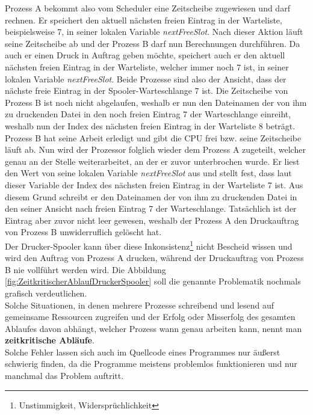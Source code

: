 \begin{description}
						Prozess A bekommt also vom Scheduler eine Zeitscheibe zugewiesen und darf rechnen. Er speichert den aktuell nächsten freien Eintrag in der Warteliste, beispielsweise 7, in seiner lokalen Variable \textit{nextFreeSlot}. Nach dieser Aktion läuft seine Zeitscheibe ab und der Prozess B darf nun Berechnungen durchführen. Da auch er einen Druck in Auftrag geben möchte, speichert auch er den aktuell nächsten freien Eintrag in der Warteliste, welcher immer noch 7 ist, in seiner lokalen Variable \textit{nextFreeSlot}. Beide Prozesse sind also der Ansicht, dass der nächste freie Eintrag in der Spooler-Warteschlange 7 ist. Die Zeitscheibe von Prozess B ist noch nicht abgelaufen, weshalb er nun den Dateinamen der von ihm zu druckenden Datei in den noch freien Eintrag 7 der Warteschlange einreiht, weshalb nun der Index des nächsten freien Eintrag in der Warteliste 8 beträgt. Prozess B hat seine Arbeit erledigt und gibt die CPU frei bzw. seine Zeitscheibe läuft ab. Nun wird der Prozessor folglich wieder dem Prozess A zugeteilt, welcher genau an der Stelle weiterarbeitet, an der er zuvor unterbrochen wurde. Er liest den Wert von seine lokalen Variable \textit{nextFreeSlot} aus und stellt fest, dass laut dieser Variable der Index des nächsten freien Eintrag in der Warteliste 7 ist. Aus diesem Grund schreibt er den Dateinamen der von ihm zu druckenden Datei in den seiner Ansicht nach freien Eintrag 7 der Warteschlange. Tatsächlich ist der Eintrag aber zuvor nicht leer gewesen, weshalb der Prozess A den Druckauftrag von Prozess B unwiderruflich gelöscht hat.\\
						Der Drucker-Spooler kann über diese Inkonsistenz\footnote{Unstimmigkeit, Widersprüchlichkeit} nicht Bescheid wissen und wird den Auftrag von Prozess A drucken, während der Druckauftrag von Prozess B nie vollführt werden wird. Die Abbildung \ref{fig:ZeitkritischerAblaufDruckerSpooler} soll die genannte Problematik nochmals grafisch verdeutlichen.\\
						Solche Situationen, in denen mehrere Prozesse schreibend und lesend auf gemeinsame Ressourcen zugreifen und der Erfolg oder Misserfolg des gesamten Ablaufes davon abhängt, welcher Prozess wann genau arbeiten kann, nennt man \textbf{zeitkritische Abläufe}.\\
						Solche Fehler lassen sich auch im Quellcode eines Programmes nur äußerst schwierig finden, da die Programme meistens problemlos funktionieren und nur manchmal das Problem auftritt.
						

\end{description}
